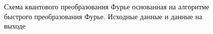 \begin{figure}
\centering



\caption{Схема квантового преобразования Фурье основанная на алгоритме
быстрого преобразования Фурье. Исходные данные и данные на выходе}
\label{figQuantCompQuantFourier0}
\end{figure}

